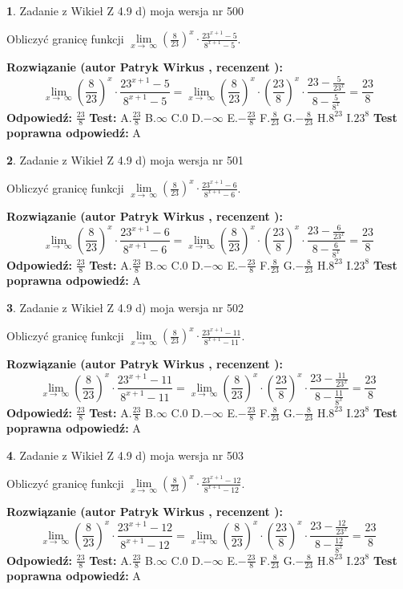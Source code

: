 \documentclass[12pt, a4paper]{article}
\theoremstyle{definition} %
\newtheorem{zad}{}
\newcommand{\zadStart}[1]{\begin{zad}#1\newline}
\newcommand{\zadStop}{\end{zad}}
\newcommand{\rozwStart}[2]{\noindent \textbf{Rozwiązanie (autor #1 , recenzent #2): }\newline}
\newcommand{\rozwStop}{\newline}
\newcommand{\odpStart}{\noindent \textbf{Odpowiedź:}\newline}
\newcommand{\odpStop}{\newline}
\newcommand{\testStart}{\noindent \textbf{Test:}\newline}
\newcommand{\testStop}{\newline}
\newcommand{\kluczStart}{\noindent \textbf{Test poprawna odpowiedź:}\newline}
\newcommand{\kluczStop}{\newline}
\begin{document}
\zadStart{Zadanie z Wikieł Z 4.9 d) moja wersja nr 500}


Obliczyć granicę funkcji  $\lim\limits_{x\to\ \infty}(\frac{8}{23})^{x}\cdot\frac{23^{x+1}-5}{8^{x+1}-5}$.
\zadStop
\rozwStart{Patryk Wirkus}{}
$$\lim\limits_{x\to\ \infty}(\frac{8}{23})^{x}\cdot\frac{23^{x+1}-5}{8^{x+1}-5}=\lim\limits_{x\to\ \infty}(\frac{8}{23})^{x}\cdot(\frac{23}{8})^{x} \cdot \frac{23-\frac{5}{23^{x}}}{8-\frac{5}{8^{x}}} = \frac{23}{8}$$
\rozwStop
\odpStart
$\frac{23}{8}$
\odpStop
\testStart
A.$\frac{23}{8}$ B.$\infty$ C.$0$ D.$-\infty$ E.$-\frac{23}{8}$
F.$\frac{8}{23}$ G.$-\frac{8}{23}$
H.$8^{23}$
I.$23^{8}$
\testStop
\kluczStart
A
\kluczStop



\zadStart{Zadanie z Wikieł Z 4.9 d) moja wersja nr 501}


Obliczyć granicę funkcji  $\lim\limits_{x\to\ \infty}(\frac{8}{23})^{x}\cdot\frac{23^{x+1}-6}{8^{x+1}-6}$.
\zadStop
\rozwStart{Patryk Wirkus}{}
$$\lim\limits_{x\to\ \infty}(\frac{8}{23})^{x}\cdot\frac{23^{x+1}-6}{8^{x+1}-6}=\lim\limits_{x\to\ \infty}(\frac{8}{23})^{x}\cdot(\frac{23}{8})^{x} \cdot \frac{23-\frac{6}{23^{x}}}{8-\frac{6}{8^{x}}} = \frac{23}{8}$$
\rozwStop
\odpStart
$\frac{23}{8}$
\odpStop
\testStart
A.$\frac{23}{8}$ B.$\infty$ C.$0$ D.$-\infty$ E.$-\frac{23}{8}$
F.$\frac{8}{23}$ G.$-\frac{8}{23}$
H.$8^{23}$
I.$23^{8}$
\testStop
\kluczStart
A
\kluczStop



\zadStart{Zadanie z Wikieł Z 4.9 d) moja wersja nr 502}


Obliczyć granicę funkcji  $\lim\limits_{x\to\ \infty}(\frac{8}{23})^{x}\cdot\frac{23^{x+1}-11}{8^{x+1}-11}$.
\zadStop
\rozwStart{Patryk Wirkus}{}
$$\lim\limits_{x\to\ \infty}(\frac{8}{23})^{x}\cdot\frac{23^{x+1}-11}{8^{x+1}-11}=\lim\limits_{x\to\ \infty}(\frac{8}{23})^{x}\cdot(\frac{23}{8})^{x} \cdot \frac{23-\frac{11}{23^{x}}}{8-\frac{11}{8^{x}}} = \frac{23}{8}$$
\rozwStop
\odpStart
$\frac{23}{8}$
\odpStop
\testStart
A.$\frac{23}{8}$ B.$\infty$ C.$0$ D.$-\infty$ E.$-\frac{23}{8}$
F.$\frac{8}{23}$ G.$-\frac{8}{23}$
H.$8^{23}$
I.$23^{8}$
\testStop
\kluczStart
A
\kluczStop



\zadStart{Zadanie z Wikieł Z 4.9 d) moja wersja nr 503}


Obliczyć granicę funkcji  $\lim\limits_{x\to\ \infty}(\frac{8}{23})^{x}\cdot\frac{23^{x+1}-12}{8^{x+1}-12}$.
\zadStop
\rozwStart{Patryk Wirkus}{}
$$\lim\limits_{x\to\ \infty}(\frac{8}{23})^{x}\cdot\frac{23^{x+1}-12}{8^{x+1}-12}=\lim\limits_{x\to\ \infty}(\frac{8}{23})^{x}\cdot(\frac{23}{8})^{x} \cdot \frac{23-\frac{12}{23^{x}}}{8-\frac{12}{8^{x}}} = \frac{23}{8}$$
\rozwStop
\odpStart
$\frac{23}{8}$
\odpStop
\testStart
A.$\frac{23}{8}$ B.$\infty$ C.$0$ D.$-\infty$ E.$-\frac{23}{8}$
F.$\frac{8}{23}$ G.$-\frac{8}{23}$
H.$8^{23}$
I.$23^{8}$
\testStop
\kluczStart
A
\kluczStop
\end{document}
